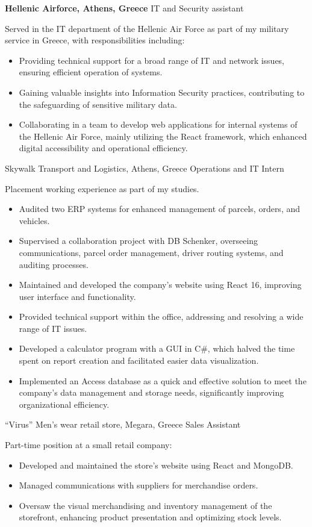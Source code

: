 {\textbf{Hellenic Airforce, Athens, Greece}}
{IT and Security assistant}
{
    Served in the IT department of the Hellenic Air Force as part of my military service in Greece, with
    responsibilities including:
    \begin{itemize}
        \item  Providing technical support for a broad range of IT and network issues, ensuring efficient operation of systems.
        \item Gaining valuable insights into Information Security practices, contributing to the safeguarding of sensitive military data.
        \item Collaborating in a team to develop web applications for internal systems of the Hellenic Air Force, mainly utilizing the React framework, which enhanced digital accessibility and operational efficiency.
    \end{itemize}
}

{Skywalk Transport and Logistics, Athens, Greece }
{Operations and IT Intern}
{

    Placement working experience as part of my studies.
    \begin{itemize}
        \item Audited two ERP systems for enhanced management of parcels, orders, and vehicles.
        \item Supervised a collaboration project with DB Schenker, overseeing communications, parcel order management, driver routing systems, and auditing processes.
        \item Maintained and developed the company's website using React 16, improving user interface and functionality.
        \item Provided technical support within the office, addressing and resolving a wide range of IT issues.
        \item Developed a calculator program with a GUI in C\#, which halved the time spent on report creation and facilitated easier data visualization.
        \item Implemented an Access database as a quick and effective solution to meet the company's data management and storage needs, significantly improving organizational efficiency.

    \end{itemize}
}

{“Virus” Men’s wear retail store, Megara, Greece}
{Sales Assistant}
{
    Part-time position at a small retail company:
    \begin{itemize}
        \item Developed and maintained the store’s website using React and MongoDB.
        \item Managed communications with suppliers for merchandise orders.
        \item Oversaw the visual merchandising and inventory management of the storefront, enhancing product presentation and optimizing stock levels.
    \end{itemize}
}
